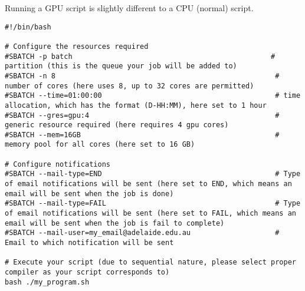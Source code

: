 \documentclass[a4]{article}
\begin{document}
Running a GPU script is slightly different to a CPU (normal) script.
\begin{lstlisting}
#!/bin/bash

# Configure the resources required
#SBATCH -p batch                                               # partition (this is the queue your job will be added to)
#SBATCH -n 8                                                    # number of cores (here uses 8, up to 32 cores are permitted)
#SBATCH --time=01:00:00                                         # time allocation, which has the format (D-HH:MM), here set to 1 hour
#SBATCH --gres=gpu:4                                            # generic resource required (here requires 4 gpu cores)
#SBATCH --mem=16GB                                              # memory pool for all cores (here set to 16 GB)

# Configure notifications 
#SBATCH --mail-type=END                                         # Type of email notifications will be sent (here set to END, which means an email will be sent when the job is done)
#SBATCH --mail-type=FAIL                                        # Type of email notifications will be sent (here set to FAIL, which means an email will be sent when the job is fail to complete)
#SBATCH --mail-user=my_email@adelaide.edu.au                    # Email to which notification will be sent

# Execute your script (due to sequential nature, please select proper compiler as your script corresponds to)
bash ./my_program.sh  
\end{lstlisting}
\end{document}

